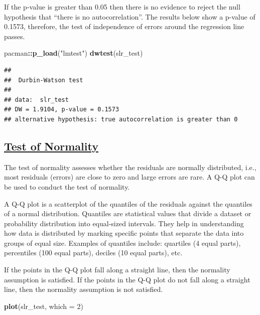 \documentclass[
]{article}
\newenvironment{Shaded}{\begin{snugshade}}{\end{snugshade}}
\newcommand{\AttributeTok}[1]{\textcolor[rgb]{0.13,0.29,0.53}{#1}}
\newcommand{\DecValTok}[1]{\textcolor[rgb]{0.00,0.00,0.81}{#1}}
\newcommand{\FunctionTok}[1]{\textcolor[rgb]{0.13,0.29,0.53}{\textbf{#1}}}
\newcommand{\NormalTok}[1]{#1}
\newcommand{\SpecialCharTok}[1]{\textcolor[rgb]{0.81,0.36,0.00}{\textbf{#1}}}
\newcommand{\StringTok}[1]{\textcolor[rgb]{0.31,0.60,0.02}{#1}}
\begin{document}
If the p-value is greater than 0.05 then there is no evidence to reject
the null hypothesis that ``there is no autocorrelation''. The results
below show a p-value of 0.1573, therefore, the test of independence of
errors around the regression line passes.

\begin{Shaded}
\begin{Highlighting}[]
\NormalTok{pacman}\SpecialCharTok{::}\FunctionTok{p\_load}\NormalTok{(}\StringTok{"lmtest"}\NormalTok{)}
\FunctionTok{dwtest}\NormalTok{(slr\_test)}
\end{Highlighting}
\end{Shaded}

\begin{verbatim}
## 
##  Durbin-Watson test
## 
## data:  slr_test
## DW = 1.9104, p-value = 0.1573
## alternative hypothesis: true autocorrelation is greater than 0
\end{verbatim}

\subsection{\texorpdfstring{\ul{\textbf{Test of
Normality}}}{Test of Normality}}\label{test-of-normality}

The test of normality assesses whether the residuals are normally
distributed, i.e., most residuals (errors) are close to zero and large
errors are rare. A Q-Q plot can be used to conduct the test of
normality.

A Q-Q plot is a scatterplot of the quantiles of the residuals against
the quantiles of a normal distribution. Quantiles are statistical values
that divide a dataset or probability distribution into equal-sized
intervals. They help in understanding how data is distributed by marking
specific points that separate the data into groups of equal size.
Examples of quantiles include: quartiles (4 equal parts), percentiles
(100 equal parts), deciles (10 equal parts), etc.

If the points in the Q-Q plot fall along a straight line, then the
normality assumption is satisfied. If the points in the Q-Q plot do not
fall along a straight line, then the normality assumption is not
satisfied.

\begin{Shaded}
\begin{Highlighting}[]
\FunctionTok{plot}\NormalTok{(slr\_test, }\AttributeTok{which =} \DecValTok{2}\NormalTok{)}
\end{Highlighting}
\end{Shaded}
\end{document}
